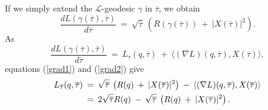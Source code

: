 \documentclass[12pt]{amsart}
\numberwithin{equation}{section}
\theoremstyle{plain}
\theoremstyle{definition}
\theoremstyle{remark}
\begin{document}
If we simply extend the ${\mathcal L}$-geodesic $\gamma$ 
in $\overline{\tau}$, we
obtain
\begin{equation} \label{grad2}
\frac{dL(\gamma(\overline{\tau}),\overline{\tau})}{d\overline{\tau}} \: = \: 
\sqrt{\overline{\tau}} \: \left( R(\gamma(\overline{\tau})) \: + \:
|X(\overline{\tau})|^2 \right).
\end{equation}
As
\begin{equation}
\frac{dL(\gamma(\overline{\tau}),\overline{\tau})}{d\overline{\tau}} \: = \:
L_{\overline{\tau}}(q, \overline{\tau}) \: + \:
\langle (\nabla L)(q, \overline{\tau}), X(\overline{\tau}) \rangle,
\end{equation}
equations (\ref{grad1}) and (\ref{grad2}) give
\begin{align} \label{timed}
L_{\overline{\tau}}(q, \overline{\tau}) \: & = \:
\sqrt{\overline{\tau}} \: \left( R(q) \: + \:
|X(\overline{\tau})|^2 \right) \: - \: 
\langle (\nabla L)(q, \overline{\tau}), X(\overline{\tau}) \rangle \\
&=\: 
2 \sqrt{\overline{\tau}} R(q) \:
- \: \sqrt{\overline{\tau}} \: \left( R(q) \: + \:
|X(\overline{\tau})|^2 \right). \notag
\end{align}
\end{document}
